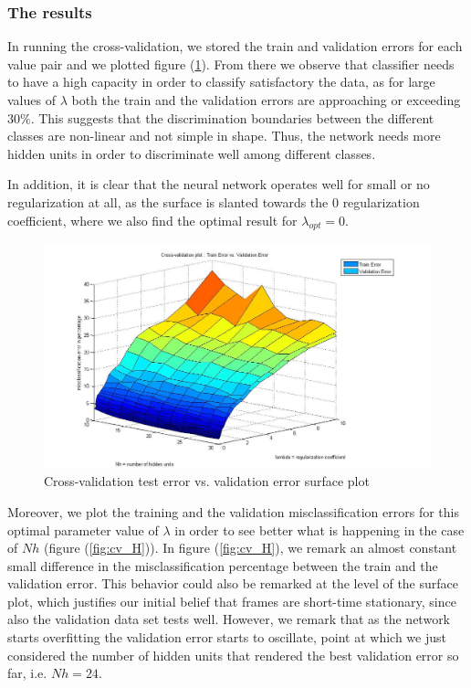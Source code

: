 \documentclass[a4paper,10pt]{article}
\begin{document}
\subsubsection{The results}
In running the cross-validation, we stored the train and validation errors for each value pair and we plotted figure (\ref{fig:cv}). From there we observe that classifier needs to have a high capacity in order to classify  satisfactory the data, as for large values of $\lambda$ both the train and the validation errors are approaching or exceeding $30 \%$. This suggests that the discrimination boundaries between the different classes are non-linear and not simple in shape. Thus,  the network needs more hidden units in order to discriminate well among different classes. 

In addition, it is clear that the neural network operates well for small or no regularization at all, as the surface is slanted towards the $0$ regularization coefficient, where we also find the optimal result for $\lambda_{opt} = 0$.

\begin{figure}[ht!]
\centering
\includegraphics[scale=0.45]{cv}
\caption{Cross-validation test error vs. validation error surface plot}\label{fig:cv}
\end{figure}

Moreover, we plot the training and the validation misclassification errors for this optimal parameter value of $\lambda$ in order to see better what is happening in the case of $Nh$ (figure (\ref{fig:cv_H})). In figure (\ref{fig:cv_H}), we remark an almost constant small difference in the misclassification percentage between the train and the validation error. This behavior could also be remarked at the level of the surface plot, which justifies our initial belief that frames are short-time stationary, since also the validation data set tests well. However, we remark that as the network starts overfitting the validation error starts to oscillate, point at which we just considered the number of hidden units that rendered the best validation error so far, i.e. $Nh =24$.   
\end{document}
